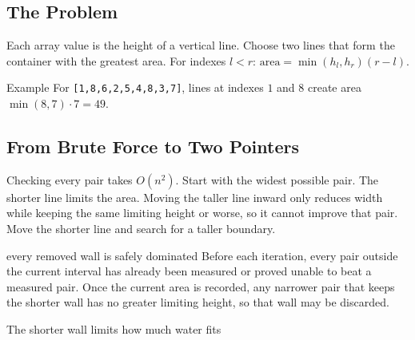 

\subsection{The Problem}
Each array value is the height of a vertical line. Choose two lines that form
the container with the greatest area. For indexes \(l<r\): \(\text{area}=\min(h_l,h_r)(r-l).\)

\begin{conceptbox}{Example}
For \texttt{[1,8,6,2,5,4,8,3,7]}, lines at indexes \(1\) and \(8\) create
area \(\min(8,7)\cdot7=49\).
\end{conceptbox}

\subsection{From Brute Force to Two Pointers}
Checking every pair takes \(O(n^2)\). Start with the widest possible pair.
The shorter line limits the area. Moving the taller line inward only reduces
width while keeping the same limiting height or worse, so it cannot improve
that pair. Move the shorter line and search for a taller boundary.

\begin{invariantbox}{every removed wall is safely dominated}
Before each iteration, every pair outside the current interval has already
been measured or proved unable to beat a measured pair. Once the current area
is recorded, any narrower pair that keeps the shorter wall has no greater
limiting height, so that wall may be discarded.
\end{invariantbox}

\begin{visualbox}{The shorter wall limits how much water fits}
\centering
{}
\end{visualbox}

